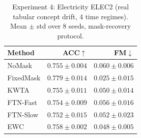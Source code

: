 \begin{table}[t]
\caption{Experiment 4: Electricity ELEC2 (real tabular concept drift, 4 time regimes). Mean $\pm$ std over 8 seeds, mask-recovery protocol.}
\label{tab:exp4}
\vskip 0.05in
\begin{center}\begin{small}\begin{sc}
\begin{tabular}{lrr}
\toprule
Method & ACC$\uparrow$ & FM$\downarrow$ \\
\midrule
NoMask & $0.755\pm0.004$ & $0.060\pm0.006$ \\
FixedMask & $0.779\pm0.014$ & $0.025\pm0.015$ \\
KWTA & $0.755\pm0.011$ & $0.050\pm0.014$ \\
FTN-Fast & $0.754\pm0.009$ & $0.056\pm0.016$ \\
FTN-Slow & $0.752\pm0.015$ & $0.052\pm0.023$ \\
EWC & $0.758\pm0.002$ & $0.048\pm0.005$ \\
\bottomrule
\end{tabular}
\end{sc}\end{small}\end{center}
\vskip -0.1in
\end{table}

